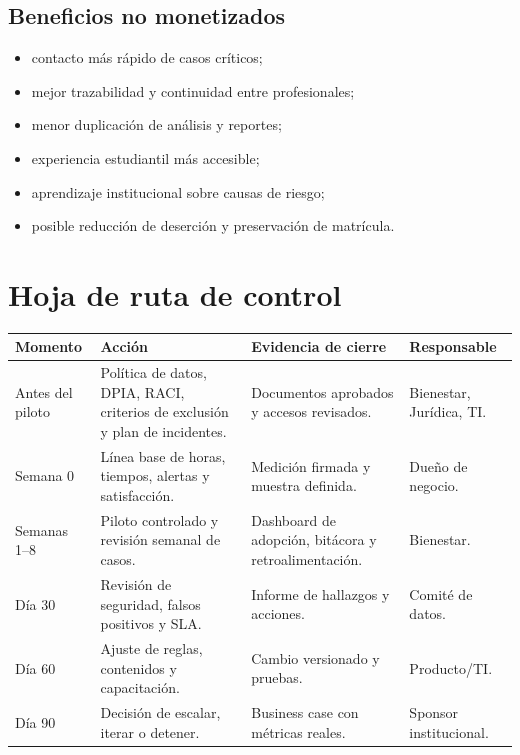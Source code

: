 \documentclass[11pt,letterpaper]{article}
\begin{document}
\subsection*{Beneficios no monetizados}
\begin{itemize}
  \item contacto más rápido de casos críticos;
  \item mejor trazabilidad y continuidad entre profesionales;
  \item menor duplicación de análisis y reportes;
  \item experiencia estudiantil más accesible;
  \item aprendizaje institucional sobre causas de riesgo;
  \item posible reducción de deserción y preservación de matrícula.
\end{itemize}

\section{Hoja de ruta de control}

\begin{longtable}{
  >{\raggedright\arraybackslash}p{}
  >{\raggedright\arraybackslash}p{}
  >{\raggedright\arraybackslash}p{}
  >{\raggedright\arraybackslash}p{}}
\toprule
\textbf{Momento} & \textbf{Acción} & \textbf{Evidencia de cierre} & \textbf{Responsable}\\
\midrule
\endhead
Antes del piloto & Política de datos, DPIA, RACI, criterios de exclusión y plan de incidentes. & Documentos aprobados y accesos revisados. & Bienestar, Jurídica, TI.\\
Semana 0 & Línea base de horas, tiempos, alertas y satisfacción. & Medición firmada y muestra definida. & Dueño de negocio.\\
Semanas 1--8 & Piloto controlado y revisión semanal de casos. & Dashboard de adopción, bitácora y retroalimentación. & Bienestar.\\
Día 30 & Revisión de seguridad, falsos positivos y SLA. & Informe de hallazgos y acciones. & Comité de datos.\\
Día 60 & Ajuste de reglas, contenidos y capacitación. & Cambio versionado y pruebas. & Producto/TI.\\
Día 90 & Decisión de escalar, iterar o detener. & Business case con métricas reales. & Sponsor institucional.\\
\bottomrule
\end{longtable}
\end{document}
